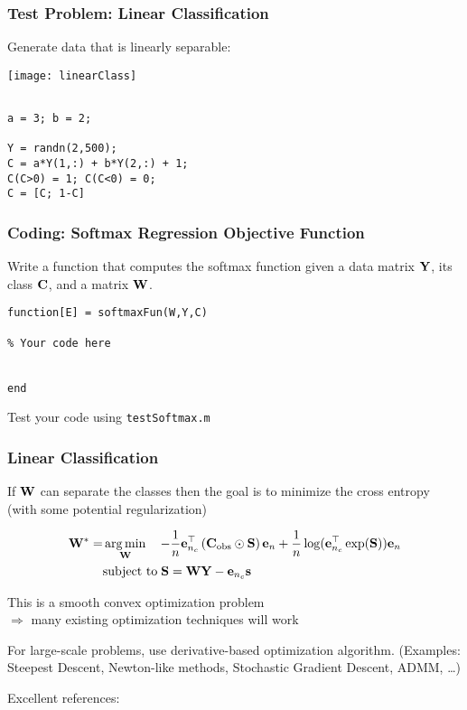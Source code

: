 \documentclass[12pt,fleqn,handout]{beamer}
\begin{document}
\begin{frame}[fragile]\frametitle{Test Problem: Linear Classification}

Generate data that is linearly separable:

\begin{center}
	\texttt{[image: linearClass]}
\end{center}
\vspace*{-5mm}
\begin{verbatim}

a = 3; b = 2;

Y = randn(2,500);
C = a*Y(1,:) + b*Y(2,:) + 1;
C(C>0) = 1; C(C<0) = 0;
C = [C; 1-C]

\end{verbatim}


\end{frame}


\begin{frame}[fragile]\frametitle{Coding: Softmax Regression Objective Function}


Write a function that computes the softmax function given a data matrix ${\bf Y}$,
its class ${\bf C}$, and a matrix ${\bf W}$.

\bigskip

\begin{verbatim}
function[E] = softmaxFun(W,Y,C)

% Your code here


end
\end{verbatim}
\begin{center}
	Test your code using \texttt{testSoftmax.m}
\end{center}
\end{frame}


\begin{frame}\frametitle{Linear Classification}

If ${\bf W}$ can separate the classes then the goal is to minimize the cross entropy (with some potential regularization)

\begin{align*}
 {\bf W}^* = & \operatorname*{arg\,min}_{{\bf W}} \quad - \frac{1}{n}{\bf e}_{n_c}^{\top} \left( {\bf C}_{\rm obs} \odot {\bf S}\right) {\bf e}_{n} 
+ \frac{1}{n} \log({\bf e}_{n_c}^\top \exp({\bf S})){\bf e}_n \\
          & \text{subject to} \;{\bf S} = {\bf W} {\bf Y} - {\bf e}_{n_c} {\bf s}
\end{align*}
\pause

This is a smooth convex optimization problem \\ $\Rightarrow$ many existing optimization techniques will work

\bigskip

For large-scale problems, use derivative-based optimization algorithm. (Examples: Steepest Descent, Newton-like methods,  Stochastic Gradient Descent, ADMM, \ldots)

\bigskip

Excellent references: \cite{NocedalWright2006,BoydVandenberghe2004,Beck2014,WuFungEtAl2019SoftmaxADMM}
\end{frame}
\end{document}
